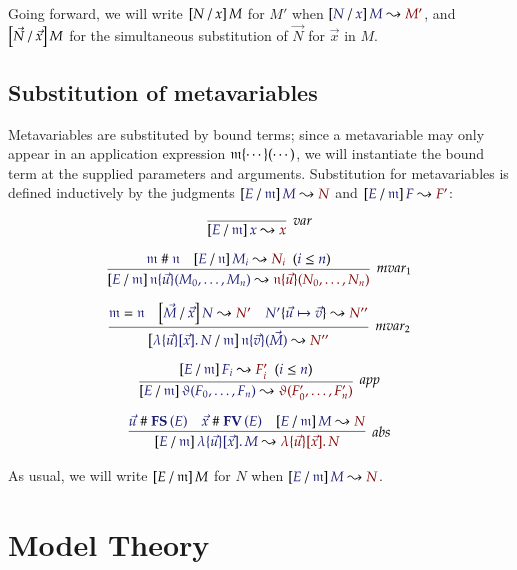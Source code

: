 \documentclass[11pt]{article}
\theoremstyle{definition}
\theoremstyle{remark}
\numberwithin{equation}{section}
\begin{document}
Going forward, we will write $\left[N\, /\, x\right]M$ for $M'$ when
$\IsSubst{N}{x}{M}{M'}$, and $\left[\vec{N}\, /\, \vec{x}\right]M$ for the simultaneous
substitution of $\vec{N}$ for $\vec{x}$ in $M$.

\subsection{Substitution of metavariables}

Metavariables are substituted by bound terms; since a metavariable may only
appear in an application expression $\mathfrak{m}\{\cdots\}(\cdots)$, we will
instantiate the bound term at the supplied parameters and arguments.
Substitution for metavariables is defined inductively by the judgments
$\IsSubst{E}{\MV{m}}{M}{N}$ and $\IsSubst{E}{\MV{m}}{F}{F'}$:

\begin{gather*}
  \infer[\textit{var}]{
    \IsSubst{E}{\MV{m}}{x}{x}
  }{
  }
\\[6pt]
  \infer[\textit{mvar}_1]{
    \IsSubst{E}{\MV{m}}{
      \MApp{\MV{n}}{\vec{u}}{M_0,\dots,M_n}
    }{
      \MApp{\MV{n}}{\vec{u}}{N_0,\dots,N_n}
    }
  }{
    \IsApart{\MV{m}}{\MV{n}}
&
    \HypJ{
      \IsSubst{E}{\MV{n}}{M_i}{N_i}
    }{
      \Leq{i}{n}
    }
  }
\\[6pt]
  \infer[\textit{mvar}_2]{
    \IsSubst{
      \MkBTm{\vec{u}}{\vec{x}}{N}
    }{\MV{m}}{
      \MApp{\MV{n}}{\vec{v}}{\vec{M}}
    }{
      N''
    }
  }{
    \IsEq{\MV{m}}{\MV{n}}
&
    \IsSubst{\vec{M}}{\vec{x}}{N}{N'}
&
    \IsRenaming{\vec{u}\mapsto\vec{v}}{N'}{N''}
  }\\[6pt]
  \infer[\textit{app}]{
    \IsSubst{E}{\MV{m}}{
      \App{\vartheta}{F_0,\dots,F_n}
    }{
      \App{\vartheta}{F'_0,\dots,F'_n}
    }
  }{
    \HypJ{
      \IsSubst{E}{\MV{m}}{F_i}{F'_i}
    }{
      \Leq{i}{n}
    }
  }
\\[6pt]
  \infer[\textit{abs}]{
    \IsSubst{E}{\MV{m}}{
      \MkBTm{\vec{u}}{\vec{x}}{M}
    }{
      \MkBTm{\vec{u}}{\vec{x}}{N}
    }
  }{
    \IsApart{\vec{u}}{\FS{E}}
&
    \IsApart{\vec{x}}{\FV{E}}
&
    \IsSubst{E}{\MV{m}}{M}{N}
  }
\end{gather*}

As usual, we will write $\left[E\, /\, \mathfrak{m}\right]M$ for $N$ when
$\IsSubst{E}{\MV{m}}{M}{N}$.

\section{Model Theory}
\end{document}
